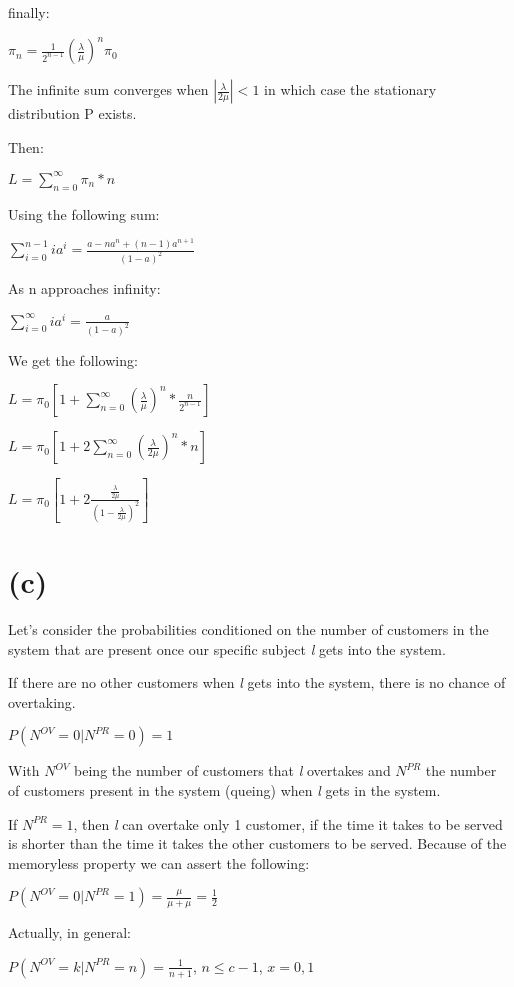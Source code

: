 \documentclass[]{article}
\begin{document}
finally:

\(\pi_n = \frac{1}{2^{n-1}} (\frac{\lambda}{\mu})^{n} \pi_0\)

The infinite sum converges when \(|\frac{\lambda}{2 \mu}| < 1\) in which
case the stationary distribution P exists.

Then:

\(L = \sum_{n=0}^{\infty} \pi_n * n\)

Using the following sum:

\(\sum_{i=0}^{n-1} i a^i = \frac{a - na^n + (n-1)a^{n+1}}{(1-a)^2}\)

As n approaches infinity:

\(\sum_{i=0}^{\infty} i a^i = \frac{a}{(1-a)^2}\)

We get the following:

\(L = \pi_0 [1 + \sum_{n=0}^{\infty} (\frac{\lambda}{\mu})^n * \frac{n}{2^{n-1}}]\)

\(L = \pi_0 [1 + 2 \sum_{n=0}^{\infty} (\frac{\lambda}{2 \mu})^n * n]\)

\(L = \pi_0 [1 + 2 \frac{\frac{\lambda}{2 \mu}}{(1 - \frac{\lambda}{2 \mu})^2}]\)

\hypertarget{c-1}{%
\section{(c)}\label{c-1}}

Let's consider the probabilities conditioned on the number of customers
in the system that are present once our specific subject \emph{l} gets
into the system.

If there are no other customers when \emph{l} gets into the system,
there is no chance of overtaking.

\(P(N^{OV} = 0 | N^{PR} = 0) = 1\)

With \(N^{OV}\) being the number of customers that \emph{l} overtakes
and \(N^{PR}\) the number of customers present in the system (queing)
when \emph{l} gets in the system.

If \(N^{PR} = 1\), then \emph{l} can overtake only 1 customer, if the
time it takes to be served is shorter than the time it takes the other
customers to be served. Because of the memoryless property we can assert
the following:

\(P(N^{OV} = 0 | N^{PR} = 1) = \frac{\mu}{\mu + \mu} = \frac{1}{2}\)

Actually, in general:

\(P(N^{OV} = k | N^{PR} = n) = \frac{1}{n+1}\), \(n \leq c - 1\),
\(x = 0,1\)
\end{document}
